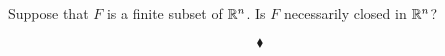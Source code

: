 \newpage


\renewcommand{\thesubsection}{\thesection.\arabic{subsection}}
\setcounter{subsection}{0}

\subsection{}
\begin{tcolorbox}
Suppose that $F$ is a finite subset of $\mathbb{R}^n$. Is $F$ necessarily closed in $\mathbb{R}^n$?
\end{tcolorbox}

$$\blacklozenge$$\\


